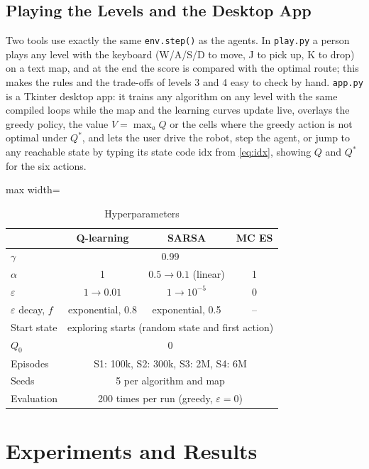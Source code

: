 \documentclass[conference]{IEEEtran}
\newcommand{\Qs}{Q^{*}}
\newcommand{\eps}{\varepsilon}
\begin{document}
\subsection{Playing the Levels and the Desktop App}
Two tools use exactly the same \texttt{env.step()} as the agents. In \texttt{play.py} a person plays any level with the keyboard (W/A/S/D to move, J to pick up, K to drop) on a text map, and at the end the score is compared with the optimal route; this makes the rules and the trade-offs of levels 3 and 4 easy to check by hand. \texttt{app.py} is a Tkinter desktop app: it trains any algorithm on any level with the same compiled loops while the map and the learning curves update live, overlays the greedy policy, the value $V=\max_a Q$ or the cells where the greedy action is not optimal under $\Qs$, and lets the user drive the robot, step the agent, or jump to any reachable state by typing its state code $\mathrm{idx}$ from \eqref{eq:idx}, showing $Q$ and $\Qs$ for the six actions.

\begin{table}[!t]
\caption{Hyperparameters}
\label{tab:hyper}
\centering
\footnotesize
\begin{adjustbox}{max width=\columnwidth}
\begin{tabular}{|l|c|c|c|}
\hline
 & \textbf{Q-learning} & \textbf{SARSA} & \textbf{MC ES} \\
\hline
$\gamma$ & \multicolumn{3}{c|}{0.99} \\
$\alpha$ & 1 & $0.5\rightarrow0.1$ (linear) & 1 \\
$\eps$ & $1\rightarrow0.01$ & $1\rightarrow10^{-5}$ & 0 \\
$\eps$ decay, $f$ & exponential, 0.8 & exponential, 0.5 & -- \\
Start state & \multicolumn{3}{c|}{exploring starts (random state and first action)} \\
$Q_0$ & \multicolumn{3}{c|}{0} \\
Episodes & \multicolumn{3}{c|}{S1: 100k, S2: 300k, S3: 2M, S4: 6M} \\
Seeds & \multicolumn{3}{c|}{5 per algorithm and map} \\
Evaluation & \multicolumn{3}{c|}{200 times per run (greedy, $\eps=0$)} \\
\hline
\end{tabular}
\end{adjustbox}
\end{table}

\section{Experiments and Results}
\end{document}
